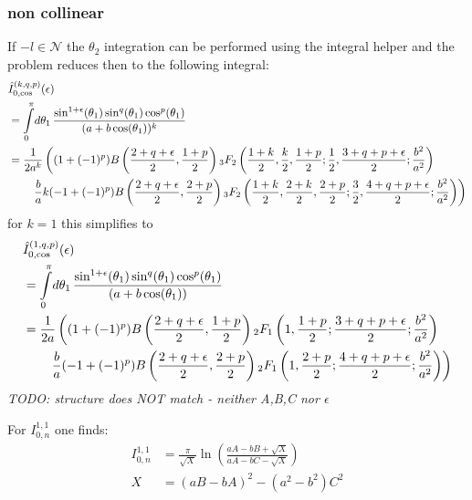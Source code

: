 \subsubsection{non collinear}
If $-l\in\mathcal N$ the $\theta_2$ integration can be performed using the integral helper and the problem reduces then to the following integral:
\begin{align}
&\hat I_{0,\cos}^{(k,q,p)}(\epsilon) \nonumber\\
&= \int\limits_0^\pi\!d\theta_1\, \frac{\sin^{1+\epsilon}(\theta_1)\sin^q(\theta_1) \cos^p(\theta_1)}{(a+b\cos(\theta_1))^k}\\
&= \frac 1 {2a^k}\left((1+(-1)^p)B\left(\frac{2+q+\epsilon}{2},\frac{1+p}{2}\right){}_{3}F_{2} \left(\frac{1+k}{2},\frac k 2,\frac{1+p}{2};\frac{1}{2},\frac{3+q+p+\epsilon}{2};\frac{b^2}{a^2}\right)\right.\nonumber\\
 &\hspace{20pt}\left. \frac b a k(-1+(-1)^p)B\left(\frac{2+q+\epsilon}{2},\frac{2+p}{2}\right){}_{3}F_{2}\left(\frac{1+k} 2,\frac{2+k}{2},\frac{2+p}{2};\frac{3}{2},\frac{4+q+p+\epsilon}{2};\frac{b^2}{a^2}\right) \right)
\end{align}
for $k=1$ this simplifies to
\begin{align}
&\hat I_{0,\cos}^{(1,q,p)}(\epsilon) \nonumber\\
&= \int\limits_0^\pi\!d\theta_1\, \frac{\sin^{1+\epsilon}(\theta_1)\sin^q(\theta_1) \cos^p(\theta_1)}{(a+b\cos(\theta_1))}\\
&= \frac 1 {2a}\left((1+(-1)^p)B\left(\frac{2+q+\epsilon}{2},\frac{1+p}{2}\right){}_{2}F_{1} \left(1,\frac{1+p}{2};\frac{3+q+p+\epsilon}{2};\frac{b^2}{a^2}\right)\right.\nonumber\\
 &\hspace{20pt}\left. \frac b a (-1+(-1)^p)B\left(\frac{2+q+\epsilon}{2},\frac{2+p}{2}\right){}_{2}F_{1}\left(1,\frac{2+p}{2};\frac{4+q+p+\epsilon}{2};\frac{b^2}{a^2}\right) \right)
\end{align}
\textit{TODO: structure does NOT match \cite[Ch. 5]{Bojak:2000eu} - neither A,B,C nor $\epsilon$}  

For $I_{0,n}^{1,1}$ one finds\cite[Ch. 5]{Bojak:2000eu}:
\begin{align}
I_{0,n}^{1,1} &= \frac{\pi}{\sqrt X}\ln\left(\frac{aA - bB + \sqrt X}{aA - bC - \sqrt X}\right)\\
X &= (aB - bA)^2 - (a^2-b^2)C^2
\end{align}

